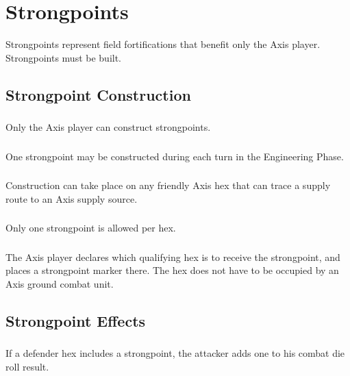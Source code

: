 \section{Strongpoints}

Strongpoints represent field fortifications that benefit only the Axis player. Strongpoints must be built.

\subsection{Strongpoint Construction}

\subsubsection{} Only the Axis player can construct strongpoints.

\subsubsection{} One strongpoint may be constructed during each turn in the Engineering Phase.

\subsubsection{} Construction can take place on any friendly Axis hex that can trace a supply route to an Axis supply source.

\subsubsection{} Only one strongpoint is allowed per hex.

\subsubsection{} The Axis player declares which qualifying hex is to receive the strongpoint, and places a strongpoint marker there. The hex does not have to be occupied by an Axis ground combat unit.

\subsection{Strongpoint Effects}

\subsubsection{} If a defender hex includes a strongpoint, the attacker adds one to his combat die roll result.

